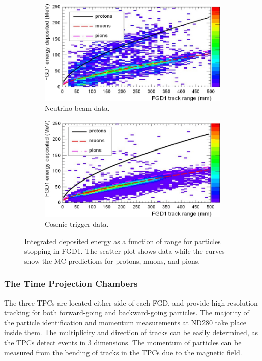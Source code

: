 \begin{figure}
\centering
\hspace{0.7cm}
\begin{subfigure}{.7\textwidth}
\centering
  \includegraphics[width=0.95\linewidth]{figs/FGD1beam}
  \caption{Neutrino beam data.}
  \label{fig:fgd1beam}
\end{subfigure}
\newline
\begin{subfigure}{.7\textwidth}
  \includegraphics[width=0.95\linewidth]{figs/FGD1cosmic}
  \caption{Cosmic trigger data.}
  \label{fig:FGD1cosmic}
\end{subfigure}
\caption{Integrated deposited energy as a function of range for particles stopping in FGD1. The scatter plot shows data while the curves show the MC predictions for protons, muons, and pions.}
\label{fig:FGD1}
\end{figure}

\subsubsection{The Time Projection Chambers}\label{sec:tpc}

The three TPCs are located either side of each FGD, and provide high resolution tracking for both forward-going and backward-going particles. The majority of the particle identification and momentum measurements at ND280 take place inside them. The multiplicity and direction of tracks can be easily determined, as the TPCs detect events in 3 dimensions. The momentum of particles can be measured from the bending of tracks in the TPCs due to the magnetic field.

